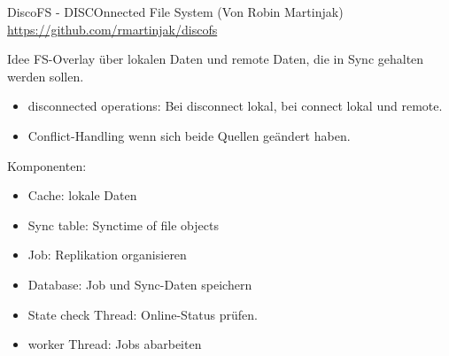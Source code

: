 \documentclass[hyperref={xetex}]{beamer}
\begin{document}
\begin{frame}{DiscoFS - DISCOnnected File System}
(Von Robin Martinjak) \href{DiscoFS}{https://github.com/rmartinjak/discofs}
\begin{block}{Idee}
FS-Overlay über lokalen Daten und remote Daten, die in Sync gehalten werden sollen.
\end{block}
\begin{itemize}
    \item disconnected operations: Bei disconnect lokal, bei connect lokal und remote. 
    \item Conflict-Handling wenn sich beide Quellen geändert haben.
\end{itemize}

Komponenten: 
\begin{itemize}
    \item Cache: lokale Daten
    \item Sync table: Synctime of file objects
    \item Job: Replikation organisieren
    \item Database: Job und Sync-Daten speichern
    \item State check Thread: Online-Status prüfen.
    \item worker Thread: Jobs abarbeiten
\end{itemize}

\end{frame}
\end{document}
